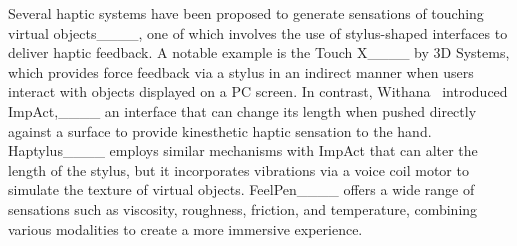 Several haptic systems have been proposed to generate sensations of touching virtual objects____, one of which involves the use of stylus-shaped interfaces to deliver haptic feedback. 
A notable example is the Touch X____ by 3D Systems, which provides force feedback via a stylus in an indirect manner when users interact with objects displayed on a PC screen. 
In contrast, Withana \etal\ introduced ImpAct,____ an interface that can change its length when pushed directly against a surface to provide kinesthetic haptic sensation to the hand.
Haptylus____ employs similar mechanisms with ImpAct that can alter the length of the stylus, but it incorporates vibrations via a voice coil motor to simulate the texture of virtual objects. 
FeelPen____ offers a wide range of sensations such as viscosity, roughness, friction, and temperature, combining various modalities to create a more immersive experience.
